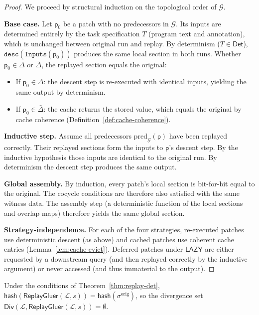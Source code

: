 \documentclass[11pt]{article}
\newcommand{\Gluer}{\mathsf{ReplayGluer}}
\newcommand{\TraceLog}{\mathcal{L}}
\newcommand{\Patch}{\mathsf{p}}
\newcommand{\DivSet}{\mathsf{Div}}
\newcommand{\GS}{\sigma}                   %
\newcommand{\HashFn}{\mathsf{hash}}
\newcommand{\DetProg}{\mathsf{Det}}
\newcommand{\ChangedSet}{\Delta}
\newcommand{\UnchangedSet}{\bar\Delta}
\newcommand{\DepGraph}{\mathcal{G}}
\newcommand{\StratLazy}{\mathsf{LAZY}}
\begin{document}
\begin{proof}
We proceed by structural induction on the topological order of
$\DepGraph$.

\medskip\noindent\textbf{Base case.}  Let $\Patch_0$ be a patch with no
predecessors in $\DepGraph$.  Its inputs are determined entirely by the
task specification $T$ (program text and annotation), which is unchanged
between original run and replay.  By determinism ($T \in \DetProg$),
$\mathtt{desc}(\mathtt{Inputs}(\Patch_0))$ produces the same local
section in both runs.  Whether $\Patch_0 \in \ChangedSet$ or
$\UnchangedSet$, the replayed section equals the original:
\begin{itemize}
\item If $\Patch_0 \in \ChangedSet$: the descent step is re-executed
  with identical inputs, yielding the same output by determinism.
\item If $\Patch_0 \in \UnchangedSet$: the cache returns the stored
  value, which equals the original by cache coherence
  (Definition~\ref{def:cache-coherence}).
\end{itemize}

\medskip\noindent\textbf{Inductive step.}  Assume all predecessors
$\mathrm{pred}_{\DepGraph}(\Patch)$ have been replayed correctly.
Their replayed sections form the inputs to $\Patch$'s descent step.  By
the inductive hypothesis those inputs are identical to the original run.
By determinism the descent step produces the same output.

\medskip\noindent\textbf{Global assembly.}  By induction, every patch's
local section is bit-for-bit equal to the original.  The cocycle
conditions are therefore also satisfied with the same witness data.
The \GLUE{} assembly step (a deterministic function of the local
sections and overlap maps) therefore yields the same global section.

\medskip\noindent\textbf{Strategy-independence.}  For each of the four
strategies, re-executed patches use deterministic descent (as above)
and cached patches use coherent cache entries (Lemma~\ref{lem:cache-evict}).
Deferred patches under $\StratLazy$ are either requested by a downstream
query (and then replayed correctly by the inductive argument) or never
accessed (and thus immaterial to the output).
\end{proof}

\begin{corollary}
\label{cor:hash-stable}
Under the conditions of Theorem~\ref{thm:replay-det},
$\HashFn(\Gluer(\TraceLog, s)) = \HashFn(\GS^{\mathrm{orig}})$,
so the divergence set $\DivSet(\TraceLog, \Gluer(\TraceLog, s)) = \emptyset$.
\end{corollary}
\end{document}
